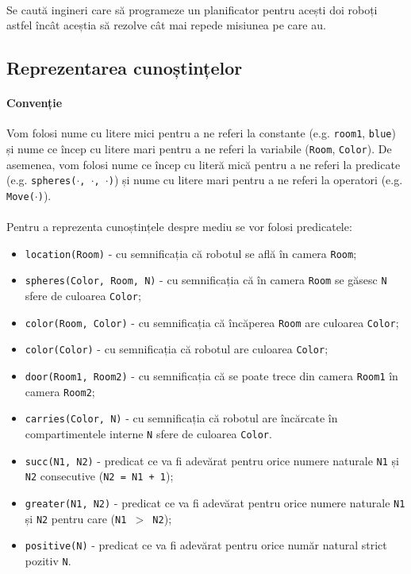 \documentclass[12pt]{article}
\newcommand{\repr}[1]{{\color{sapphire}\texttt{#1}}}
\begin{document}
\paragraph{}

Se caută ingineri care să programeze un planificator pentru acești doi
roboți astfel încât aceștia să rezolve cât mai repede misiunea pe care
au.

\subsection{Reprezentarea cunoștințelor}
\label{sec:reprezentare}

\paragraph{Convenție}

Vom folosi nume cu litere mici pentru a ne referi la constante
(e.g. \repr{room1}, \repr{blue}) și nume ce încep cu litere mari
pentru a ne referi la variabile (\repr{Room}, \repr{Color}). De
asemenea, vom folosi nume ce încep cu literă mică pentru a ne referi
la predicate (e.g. \repr{spheres($\cdot$, $\cdot$, $\cdot$)}) și nume
cu litere mari pentru a ne referi la operatori
(e.g. \repr{Move($\cdot$)}).

\paragraph{}

Pentru a reprezenta cunoștințele despre mediu se vor folosi
predicatele:
\begin{itemize}
\item \repr{location(Room)} - cu semnificația că robotul se află în
  camera \repr{Room};
\item \repr{spheres(Color, Room, N)} - cu semnificația că în camera
  \repr{Room} se găsesc \repr{N} sfere de culoarea \repr{Color};
\item \repr{color(Room, Color)} - cu semnificația că încăperea
  \repr{Room} are culoarea \repr{Color};
\item \repr{color(Color)} - cu semnificația că robotul are culoarea
  \repr{Color};
\item \repr{door(Room1, Room2)} - cu semnificația că se poate trece
  din camera \repr{Room1} în camera \repr{Room2};
\item \repr{carries(Color, N)} - cu semnificația că robotul are
  încărcate în compartimentele interne \repr{N} sfere de culoarea
  \repr{Color}.
\item \repr{succ(N1, N2)} - predicat ce va fi adevărat pentru orice
  numere naturale \repr{N1} și \repr{N2} consecutive (\repr{N2 =
    N1 + 1});
\item \repr{greater(N1, N2)} - predicat ce va fi adevărat pentru
  orice numere naturale \repr{N1} și \repr{N2} pentru care
  (\repr{N1 $>$ N2});
\item \repr{positive(N)} - predicat ce va fi adevărat pentru orice
  număr natural strict pozitiv \repr{N}.
\end{itemize}
\end{document}
